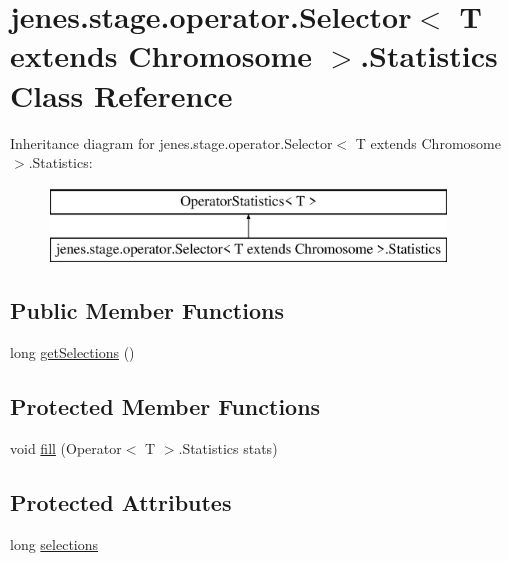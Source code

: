 \hypertarget{classjenes_1_1stage_1_1operator_1_1_selector_3_01_t_01extends_01_chromosome_01_4_1_1_statistics}{\section{jenes.\-stage.\-operator.\-Selector$<$ T extends Chromosome $>$.Statistics Class Reference}
\label{classjenes_1_1stage_1_1operator_1_1_selector_3_01_t_01extends_01_chromosome_01_4_1_1_statistics}
}
Inheritance diagram for jenes.\-stage.\-operator.\-Selector$<$ T extends Chromosome $>$.Statistics\-:\begin{figure}[H]
\begin{center}
\leavevmode
\includegraphics[height=2.000000cm]{classjenes_1_1stage_1_1operator_1_1_selector_3_01_t_01extends_01_chromosome_01_4_1_1_statistics}
\end{center}
\end{figure}
\subsection*{Public Member Functions}
\begin{DoxyCompactItemize}
\item 
long \hyperlink{classjenes_1_1stage_1_1operator_1_1_selector_3_01_t_01extends_01_chromosome_01_4_1_1_statistics_a0145f6cec84ff007289d206f579a117a}{get\-Selections} ()
\end{DoxyCompactItemize}
\subsection*{Protected Member Functions}
\begin{DoxyCompactItemize}
\item 
void \hyperlink{classjenes_1_1stage_1_1operator_1_1_selector_3_01_t_01extends_01_chromosome_01_4_1_1_statistics_ab1db0e72568009d65141927f039ffe84}{fill} (Operator$<$ T $>$.Statistics stats)
\end{DoxyCompactItemize}
\subsection*{Protected Attributes}
\begin{DoxyCompactItemize}
\item 
long \hyperlink{classjenes_1_1stage_1_1operator_1_1_selector_3_01_t_01extends_01_chromosome_01_4_1_1_statistics_a8308f3f0177bfe79fcbf46bd4ac93cc4}{selections}
\end{DoxyCompactItemize}


